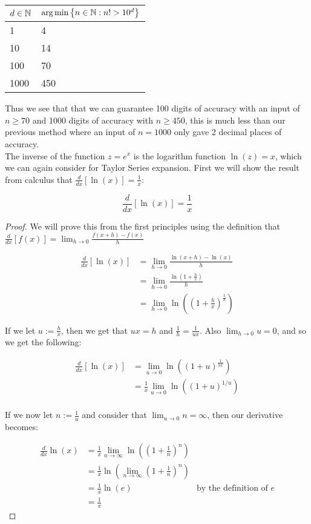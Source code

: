 \begin{center}
\begin{tabular}{|l|l|}
\hline
\(d \in \mathbb{N}\) 
	& \(\textrm{arg}\min\left\{n \in \mathbb{N} : n! > 10^d\right\}\)\\\hline
1 & 4\\\hline
10 & 14 \\\hline
100 & 70 \\\hline
1000 & 450\\\hline
\end{tabular}
\end{center}

Thus we see that that we can guarantee 100 digits of accuracy with an input of \(n \ge 70\) and 1000 digits of accuracy with \(n \ge 450\), this is much less than our previous method where an input of \(n = 1000\) only gave 2 decimal places of accuracy.\\

The inverse of the function \(z = e^x\) is the logarithm function \(\ln(z) = x\), which we can again consider for Taylor Series expansion. First we will show the result from calculus that \(\frac{d}{dx}[\ln(x)] = \frac{1}{x}\):

\begin{nat log dif}
\[\frac{d}{dx}[\ln(x)] = \frac{1}{x}\]
\end{nat log dif}
\begin{proof}
We will prove this from the first principles using the definition that \(\frac{d}{dx}[f(x)] = \lim_{h\to 0} \frac{f(x + h) - f(x)}{h}\)

\begin{align*}
	\frac{d}{dx}[\ln(x)] 
		&= \lim_{h\to 0}\frac{\ln(x + h) - \ln(x)}{h}\\
		&= \lim_{h\to 0}\frac{\ln(1 + \frac{h}{x})}{h}\\
		&= \lim_{h\to 0}\ln\left((1+\frac{h}{x})^{\frac{1}{h}}\right)
\end{align*}

If we let \(u := \frac{h}{x}\), then we get that \(ux = h\) and \(\frac{1}{h} = \frac{1}{ux}\). Also \(\lim_{h\to 0}u = 0\), and so we get the following:

\begin{align*}
	\frac{d}{dx}[\ln(x)]
		&= \lim_{u\to 0}\ln((1+u)^{\frac{1}{ux}})\\
		&= \frac{1}{x}\lim_{u\to 0}\ln((1+u)^{1/u})\\
\end{align*}

If we now let \(n := \frac{1}{u}\) and consider that \(\lim_{u\to 0} n = \infty\), then our derivative becomes:

\begin{align*}
	\frac{d}{dx}\ln(x) 
		&= \frac{1}{x}\lim_{n\to\infty}\ln((1 + \frac{1}{n})^n)\\
		&= \frac{1}{x}\ln(\lim_{n\to\infty}(1+\frac{1}{n})^n)\\
		&= \frac{1}{x}\ln(e) &\textrm{by the definition of \(e\)}\\
		&= \frac{1}{x}
\end{align*}
\end{proof}

